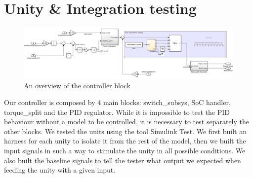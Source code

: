 \documentclass[12pt,a4paper]{report}
\begin{document}
\section{Unity \& Integration testing}
\begin{figure}[!h]
	\centering
	\includegraphics[scale=0.34]{Controller_overview.jpg}
	\caption{An overview of the controller block}
	\label{Controller_overview}
\end{figure}
Our controller is composed by 4 main blocks: switch\_subsys, SoC handler, torque\_split and the PID regulator.
While it is impossible to test the PID behaviour without a model to be controlled, it is necessary to test separately the other blocks.
We tested the units using the tool Simulink Test. We first built an harness for each unity to isolate it from the rest of the model, then we built the input signals in such a way to stimulate the unity in all possible conditions. We also built the baseline signals to tell the tester what output we expected when feeding the unity with a given input. 
\newpage
\end{document}
